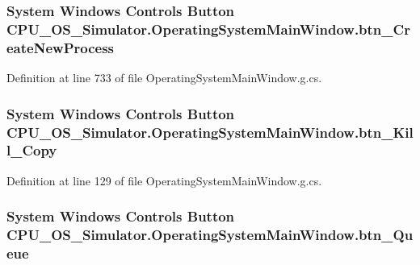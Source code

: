 \subsubsection[{btn\+\_\+\+Create\+New\+Process}]{\setlength{\rightskip}{0pt plus 5cm}System Windows Controls Button C\+P\+U\+\_\+\+O\+S\+\_\+\+Simulator.\+Operating\+System\+Main\+Window.\+btn\+\_\+\+Create\+New\+Process\hspace{0.3cm}{\ttfamily [package]}}\label{class_c_p_u___o_s___simulator_1_1_operating_system_main_window_a30b8c5bcaa36e85ba4b41f23c1bbfdde}


Definition at line 733 of file Operating\+System\+Main\+Window.\+g.\+cs.

\hypertarget{class_c_p_u___o_s___simulator_1_1_operating_system_main_window_a408a9f81462c276937e813344d29fc3c}{}
\subsubsection[{btn\+\_\+\+Kill\+\_\+\+Copy}]{\setlength{\rightskip}{0pt plus 5cm}System Windows Controls Button C\+P\+U\+\_\+\+O\+S\+\_\+\+Simulator.\+Operating\+System\+Main\+Window.\+btn\+\_\+\+Kill\+\_\+\+Copy\hspace{0.3cm}{\ttfamily [package]}}\label{class_c_p_u___o_s___simulator_1_1_operating_system_main_window_a408a9f81462c276937e813344d29fc3c}


Definition at line 129 of file Operating\+System\+Main\+Window.\+g.\+cs.

\hypertarget{class_c_p_u___o_s___simulator_1_1_operating_system_main_window_a241f1be0b04ce501c83e182629a6c694}{}
\subsubsection[{btn\+\_\+\+Queue}]{\setlength{\rightskip}{0pt plus 5cm}System Windows Controls Button C\+P\+U\+\_\+\+O\+S\+\_\+\+Simulator.\+Operating\+System\+Main\+Window.\+btn\+\_\+\+Queue\hspace{0.3cm}{\ttfamily [package]}}\label{class_c_p_u___o_s___simulator_1_1_operating_system_main_window_a241f1be0b04ce501c83e182629a6c694}


